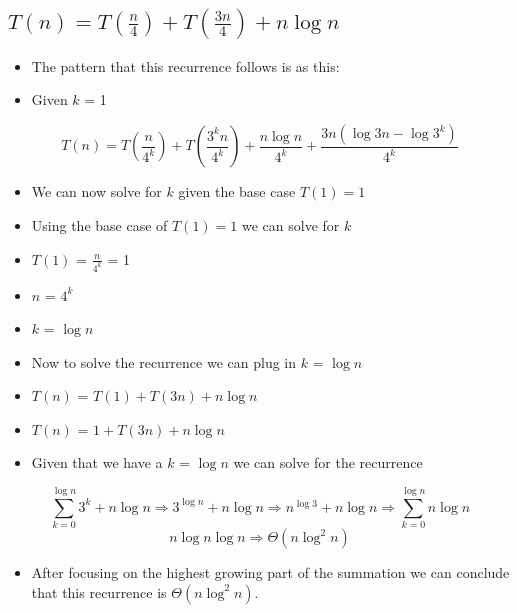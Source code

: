 \documentclass{article}[12pt]
\begin{document}
\pagebreak

\vspace*{10px}
\subsection{$T(n) = T\left(\frac{n}{4}\right) + T\left(\frac{3n}{4}\right) + n \log n$}
\begin{itemize}
  \item The pattern that this recurrence follows is as this:
  \item Given $k$ = 1
\end{itemize}

\begin{equation*}
  T(n) = T(\frac{n}{4^{k}}) + T(\frac{3^{k}n}{4^{k}}) + \frac{n \log n}{4^{k}} + \frac{3n (\log 3n - \log 3^{k})}{4^{k}}
\end{equation*}
\begin{itemize}
  \item We can now solve for $k$ given the base case $T(1) = 1$
  \item Using the base case of $T(1)=1$ we can solve for $k$
  \item $T(1)$ = $\frac{n}{4^{k}}$ = 1
  \item $n$ = $4^{k}$
  \item $k$ = $\log n$
  \item Now to solve the recurrence we can plug in $k$ = $\log n$
  \item $T(n)$ = $T(1) + T(3n) + n \log n$
  \item $T(n)$ = $1 + T(3n) + n \log n$
  \item Given that we have a $k$ = $\log n$ we can solve for the recurrence
\end{itemize}
\begin{equation*}
  \sum_{k=0}^{\log n} 3^{k} + n \log n
  \Rightarrow 3^{\log n} + n \log n
  \Rightarrow n^{\log 3} + n \log n
  \Rightarrow \sum_{k=0}^{\log n} n \log n
\end{equation*}
\begin{equation*}
  n \log n \log n
  \Rightarrow \Theta(n \log^{2} n)
\end{equation*}
\begin{itemize}
  \item After focusing on the highest growing part of the summation
    we can conclude that this recurrence is $\Theta(n \log^{2} n)$.
\end{itemize}


\pagebreak
\end{document}
